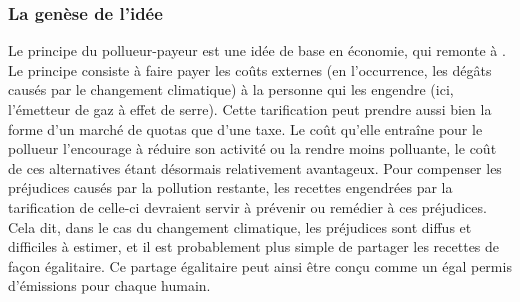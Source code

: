 \documentclass[a5paper,french]{memoir}
\begin{document}
\subsubsection{La genèse de l'idée}
Le principe du pollueur-payeur est une idée de base en économie, qui remonte à \citet{pigou_economics_1920}. Le principe consiste à faire payer les coûts externes (en l'occurrence, les dégâts causés par le changement climatique) à la personne qui les engendre (ici, l'émetteur de gaz à effet de serre). Cette tarification peut prendre aussi bien la forme d'un marché de quotas que d'une taxe. Le coût qu'elle entraîne pour le pollueur l'encourage à réduire son activité ou la rendre moins polluante, le coût de ces alternatives étant désormais relativement avantageux. 
Pour compenser les préjudices causés par la pollution restante, les recettes engendrées par la tarification de celle-ci devraient servir à prévenir ou remédier à ces préjudices. 
Cela dit, dans le cas du changement climatique, les préjudices sont diffus et difficiles à estimer, et il est probablement plus simple de partager les recettes de façon égalitaire. Ce partage égalitaire peut ainsi être conçu comme un égal permis d'émissions pour chaque humain. 
\end{document}
